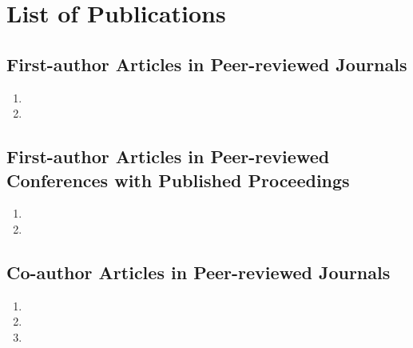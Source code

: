 \chapter{List of Publications}

\section*{First-author Articles in Peer-reviewed Journals} %
\label{sec:first_author_journal_articles}
\begin{enumerate}
    \item {}
    \item {} %
\end{enumerate}

\section*{First-author Articles in Peer-reviewed Conferences with Published Proceedings}
\label{sec:first_author_peer_reviewed_conference_papers}
\begin{enumerate}
    \item {}
    \item {}
\end{enumerate}

\section*{Co-author Articles in Peer-reviewed Journals} %
\label{sec:journal_articles}
\begin{enumerate}
    \item {}
    \item {}
    \item {}
\end{enumerate}
